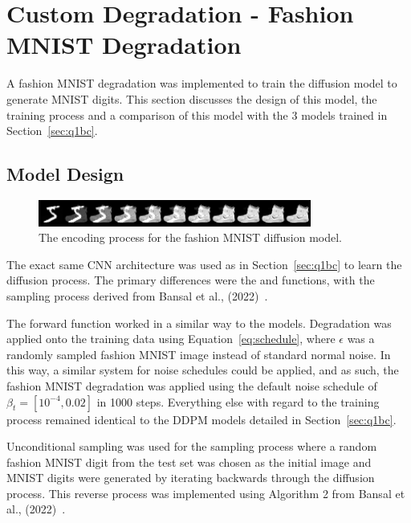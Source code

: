 
\section{Custom Degradation - Fashion MNIST Degradation}\label{sec:q2}
A fashion MNIST degradation was implemented to train the diffusion model to generate MNIST digits.
This section discusses the design of this model, the training process and a comparison of this model with the 3 models
trained in Section~\eqref{sec:q1bc}.

\subsection{Model Design}\label{subsec:model-design}
\begin{figure}[t]
    \centering
    \includegraphics[width=0.8\textwidth]{figures/q2_encoding}
    \caption{The encoding process for the fashion MNIST diffusion model.}
    \label{fig:q2_encoding}
\end{figure}

The exact same CNN architecture was used as in Section~\eqref{sec:q1bc} to learn the diffusion process.
The primary differences were the  and  functions, with the sampling process
derived from Bansal et al., (2022)~\cite{bansal}.

The forward function worked in a similar way to the  models.
Degradation was applied onto the training data using Equation~\eqref{eq:schedule}, where $\epsilon$ was a randomly
sampled fashion MNIST image instead of standard normal noise.
In this way, a similar system for noise schedules could be applied, and as such, the fashion MNIST degradation was
applied using the default noise schedule of $\beta_{t} = [10^{-4}, 0.02]$ in 1000 steps.
Everything else with regard to the training process remained identical to the DDPM models detailed in Section~\eqref{sec:q1bc}.

Unconditional sampling was used for the sampling process where a random fashion MNIST digit from the test set was chosen
as the initial image and MNIST digits were generated by iterating backwards through the diffusion process.
This reverse process was implemented using Algorithm 2 from Bansal et al., (2022)~\cite{bansal}.

